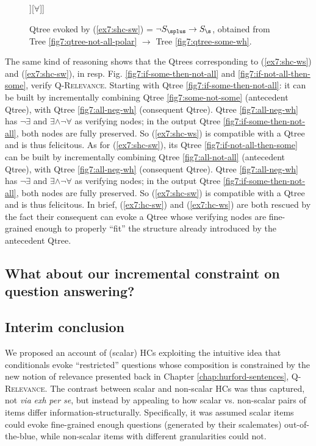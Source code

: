 \begin{figure}[H]
	\centering
	\begin{forest}
		[CS[$\neg\forall$[$\neg\exists$][\fbox{$\exists\wedge\neg\forall$}]][$\forall$]]
	\end{forest}
	\caption[]{Qtree evoked by (\ref{ex7:shc-sw}) = $\neg S_{\splus} \rightarrow S_{\s}$, obtained from Tree  \ref{fig7:qtree-not-all-polar} $\rightarrow$ Tree \ref{fig7:qtree-some-wh}.}\label{fig7:qtree-shc-sw-polar-wh}
\end{figure}

The same kind of reasoning shows that the Qtrees corresponding to (\ref{ex7:shc-ws}) and (\ref{ex7:shc-sw}), in resp. Fig. \ref{fig7:if-some-then-not-all} and \ref{fig7:if-not-all-then-some}, verify \textsc{Q-Relevance}. Starting with Qtree \ref{fig7:if-some-then-not-all}: it can be built by incrementally combining  Qtree \ref{fig7:some-not-some} (antecedent Qtree), with Qtree \ref{fig7:all-neg-wh} (consequent Qtree). Qtree \ref{fig7:all-neg-wh} has $\neg\exists$ and $\exists\wedge\neg\forall$ as verifying nodes; in the output Qtree \ref{fig7:if-some-then-not-all}, both nodes are fully preserved. So (\ref{ex7:shc-ws}) is compatible with a Qtree and is thus felicitous. As for (\ref{ex7:shc-sw}), its Qtree \ref{fig7:if-not-all-then-some} can be built by incrementally combining  Qtree \ref{fig7:all-not-all} (antecedent Qtree), with Qtree \ref{fig7:all-neg-wh} (consequent Qtree). Qtree \ref{fig7:all-neg-wh} has $\neg\exists$ and $\exists\wedge\neg\forall$ as verifying nodes; in the output Qtree \ref{fig7:if-some-then-not-all}, both nodes are fully preserved. So (\ref{ex7:shc-sw}) is compatible with a Qtree and is thus felicitous. In brief, (\ref{ex7:hc-sw}) and (\ref{ex7:hc-ws}) are both rescued by the fact their consequent can evoke a Qtree whose verifying nodes are fine-grained enough to properly ``fit'' the structure already introduced by the antecedent Qtree.

\subsection{What about our incremental constraint on question answering?}


\subsection{Interim conclusion}
We proposed an account of (scalar) HCs exploiting the intuitive idea that conditionals evoke ``restricted'' questions whose composition is constrained by the new notion of relevance presented back in Chapter \ref{chap:hurford-sentences}, \textsc{Q-Relevance}. The contrast between scalar and non-scalar HCs was thus captured, not \textit{via} \textit{exh} \textit{per se}, but instead by appealing to how scalar vs. non-scalar pairs of items differ information-structurally. Specifically, it was assumed scalar items could evoke fine-grained enough questions (generated by their scalemates) out-of-the-blue, while non-scalar items with different granularities could not.\\


